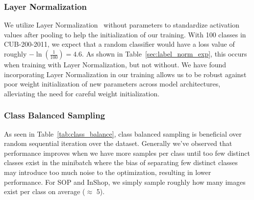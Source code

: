 \documentclass{bmvc2k}
\begin{document}
\subsubsection{Layer Normalization}
\label{sec:layer_norm_exp}
We utilize Layer Normalization~\cite{layernorm} without parameters to standardize activation values after pooling to help the initialization of our training. With 100 classes in CUB-200-2011, we expect that a random classifier would have a loss value of roughly $-\ln(\frac{1}{100}) = 4.6$. As shown in Table~\ref{sec:label_norm_exp}, this occurs when training with Layer Normalization, but not without. We have found incorporating Layer Normalization in our training allows us to be robust against poor weight initialization of new parameters across model architectures, alleviating the need for careful weight initialization.

\begin{table}
\begin{center}
\end{center}
\caption{ResNet50 Recall@1 on CUB-200-2011 dataset across varying samples per class for batch size of 75. (\textbf{S}) Samples per class in batch. (\textbf{C}) Distinct classes in batch. First column shows no class balancing in batch}
\label{tab:class_balance}
\end{table}

\subsubsection{Class Balanced Sampling}
\label{sec:class_balance_exp}
 As seen in Table~\ref{tab:class_balance}, class balanced sampling is beneficial over random sequential iteration over the dataset. Generally we've observed that performance improves when we have more samples per class until too few distinct classes exist in the minibatch where the bias of separating few distinct classes may introduce too much noise to the optimization, resulting in lower performance. For SOP and InShop, we simply sample roughly how many images exist per class on average ($\approx$ 5).
\end{document}
